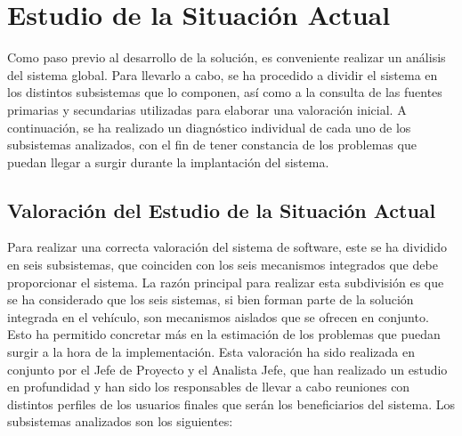 \documentclass[10pt,a4paper,oldfontcommands]{dpds}
\begin{document}
\pagecolor{fondo}
\color{principal}


\section{Estudio de la Situación Actual}
\par Como paso previo al desarrollo de la solución, es conveniente realizar un análisis del sistema global. Para llevarlo a cabo, se ha procedido a dividir el sistema en los distintos subsistemas que lo componen, así como a la consulta de las fuentes primarias y secundarias utilizadas para elaborar una valoración inicial. A continuación, se ha realizado un diagnóstico individual de cada uno de los subsistemas analizados, con el fin de tener constancia de los problemas que puedan llegar a surgir durante la implantación del sistema.

\subsection{Valoración del Estudio de la Situación Actual}
\par Para realizar una correcta valoración del sistema de software, este se ha dividido en seis subsistemas, que coinciden con los seis mecanismos integrados que debe proporcionar el sistema. La razón principal para realizar esta subdivisión es que se ha considerado que los seis sistemas, si bien  forman parte de la solución integrada en el vehículo, son mecanismos aislados que se ofrecen en conjunto. Esto ha permitido concretar más en la estimación de los problemas que puedan surgir a la hora de la implementación. Esta valoración ha sido realizada en conjunto por el Jefe de Proyecto y el Analista Jefe, que han realizado un estudio en profundidad y han sido los responsables de llevar a cabo reuniones con distintos perfiles de los usuarios finales que serán los beneficiarios del sistema. Los subsistemas analizados son los siguientes:
\end{document}
